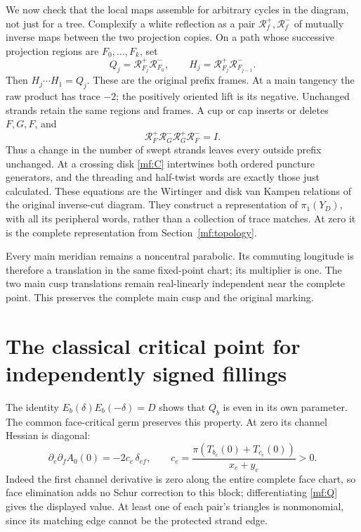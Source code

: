 \documentclass[11pt]{article}
\numberwithin{equation}{section}
\theoremstyle{definition}
\theoremstyle{remark}
\begin{document}
We now check that the local maps assemble for arbitrary cycles in the
diagram, not just for a tree. Complexify a white reflection as a pair
\(\mathcal R_f^+,\mathcal R_f^-\) of mutually inverse maps between
the two projection copies. On a path whose successive projection regions
are \(F_0,\ldots,F_k\), set
\[
 Q_j=\mathcal R_{F_j}^+\mathcal R_{F_0}^-,
 \qquad H_j=\mathcal R_{F_j}^+\mathcal R_{F_{j-1}}^- .
\]
Then \(H_j\cdots H_1=Q_j\). These are the original prefix frames.
At a main tangency the raw product has trace \(-2\); the positively
oriented lift is its negative. Unchanged strands retain the same
regions and frames. A cup or cap inserts or deletes \(F,G,F\), and
\[
 \mathcal R_F^+\mathcal R_G^-
       \mathcal R_G^+\mathcal R_F^-=I.
\]
Thus a change in the number of swept strands leaves every outside
prefix unchanged. At a crossing disk \eqref{mf:C} intertwines both
ordered puncture generators, and the threading and half-twist words
are exactly those just calculated. These equations are the
Wirtinger and disk van Kampen relations of the original inverse-cut
diagram. They construct a representation of \(\pi_1(Y_D)\), with
all its peripheral words, rather than a collection of trace matches.
At zero it is the complete representation from
Section~\ref{mf:topology}.

Every main meridian remains a noncentral parabolic. Its commuting
longitude is therefore a translation in the same fixed-point chart;
its multiplier is one. The two main cusp translations remain
real-linearly independent near the complete point. This preserves
the complete main cusp and the original marking.

\section{The classical critical point for independently signed fillings}
\label{mf:critical}

The identity \(E_b(\delta)E_b(-\delta)=D\) shows that \(Q_b\) is even
in its own parameter. The common face-critical germ preserves this
property. At zero its channel Hessian is diagonal:
\begin{equation}\label{mf:channel-hessian}
 \partial_e\partial_fA_0(0)=-2c_e\,\delta_{ef},
 \qquad c_e=\frac{\pi(T_{b_e}(0)+T_{c_e}(0))}{x_e+y_e}>0 .
\end{equation}
Indeed the first channel derivative is zero along the entire complete
face chart, so face elimination adds no Schur correction to this
block; differentiating \eqref{mf:Q} gives the displayed value.
At least one of each pair's triangles is nonmonomial, since its
matching edge cannot be the protected strand edge.
\end{document}
